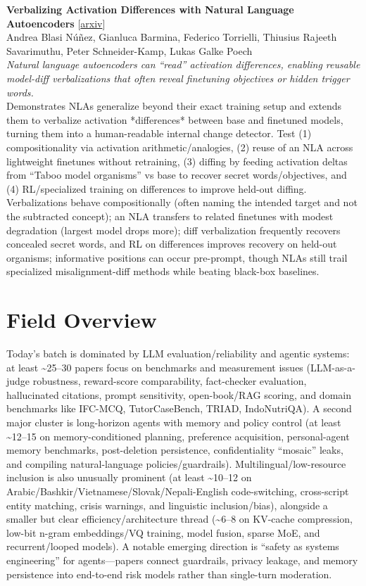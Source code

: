 \documentclass[12pt,letterpaper]{article}
\begin{document}
{\small\textbf{Verbalizing Activation Differences with Natural Language Autoencoders}} {\scriptsize[\href{https://arxiv.org/abs/2610.30934}{arxiv}]}\\
{\scriptsize Andrea Blasi N\'u\~nez, Gianluca Barmina, Federico Torrielli, Thiusius Rajeeth Savarimuthu, Peter Schneider-Kamp, Lukas Galke Poech}\\

{\small\textit{Natural language autoencoders can ``read'' activation differences, enabling reusable model-diff verbalizations that often reveal finetuning objectives or hidden trigger words.}}\\[1pt]
{\footnotesize Demonstrates NLAs generalize beyond their exact training setup and extends them to verbalize activation *differences* between base and finetuned models, turning them into a human-readable internal change detector. Test (1) compositionality via activation arithmetic/analogies, (2) reuse of an NLA across lightweight finetunes without retraining, (3) diffing by feeding activation deltas from ``Taboo model organisms'' vs base to recover secret words/objectives, and (4) RL/specialized training on differences to improve held-out diffing. Verbalizations behave compositionally (often naming the intended target and not the subtracted concept); an NLA transfers to related finetunes with modest degradation (largest model drops more); diff verbalization frequently recovers concealed secret words, and RL on differences improves recovery on held-out organisms; informative positions can occur pre-prompt, though NLAs still trail specialized misalignment-diff methods while beating black-box baselines.}

\medskip



\section*{Field Overview}
{\footnotesize Today's batch is dominated by LLM evaluation/reliability and agentic systems: at least \textasciitilde{}25--30 papers focus on benchmarks and measurement issues (LLM-as-a-judge robustness, reward-score comparability, fact-checker evaluation, hallucinated citations, prompt sensitivity, open-book/RAG scoring, and domain benchmarks like IFC-MCQ, TutorCaseBench, TRIAD, IndoNutriQA). A second major cluster is long-horizon agents with memory and policy control (at least \textasciitilde{}12--15 on memory-conditioned planning, preference acquisition, personal-agent memory benchmarks, post-deletion persistence, confidentiality ``mosaic'' leaks, and compiling natural-language policies/guardrails). Multilingual/low-resource inclusion is also unusually prominent (at least \textasciitilde{}10--12 on Arabic/Bashkir/Vietnamese/Slovak/Nepali-English code-switching, cross-script entity matching, crisis warnings, and linguistic inclusion/bias), alongside a smaller but clear efficiency/architecture thread (\textasciitilde{}6--8 on KV-cache compression, low-bit n-gram embeddings/VQ training, model fusion, sparse MoE, and recurrent/looped models). A notable emerging direction is ``safety as systems engineering'' for agents---papers connect guardrails, privacy leakage, and memory persistence into end-to-end risk models rather than single-turn moderation.}
\end{document}
